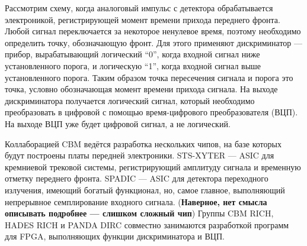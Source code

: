 Рассмотрим схему, когда аналоговый импульс с детектора обрабатывается электроникой, регистрирующей момент времени прихода переднего фронта. Любой сигнал переключается за некоторое ненулевое время, поэтому необходимо определить точку, обозначающую фронт. Для этого применяют дискриминатор --- прибор, вырабатывающий логический ``0'', когда входной сигнал ниже установленного порога, и логическую ``1'', когда входной сигнал выше установленного порога. Таким образом точка пересечения сигнала и порога это точка, условно обозначающая момент времени прихода сигнала. На выходе дискриминатора получается логический сигнал, который необходимо преобразовать в цифровой с помощью время-цифрового преобразователя (ВЦП). На выходе ВЦП уже будет цифровой сигнал, а не логический.

Коллаборацией CBM ведётся разработка нескольких чипов, на базе которых будут построены платы передней электроники. STS-XYTER --- ASIC для кремниевой трековой системы, регистрирующий амплитуду сигнала и временную отметку переднего фронта. SPADIC --- ASIC для детектора переходного излучения, имеющий богатый функционал, но, самое главное, выполняющий непрерывное семплирование входного сигнала. (\textbf{Наверное, нет смысла описывать подробнее --- слишком сложный чип}) Группы CBM RICH, HADES RICH и PANDA DIRC совместно занимаются разработкой программ для FPGA, выполняющих функции дискриминатора и ВЦП.

